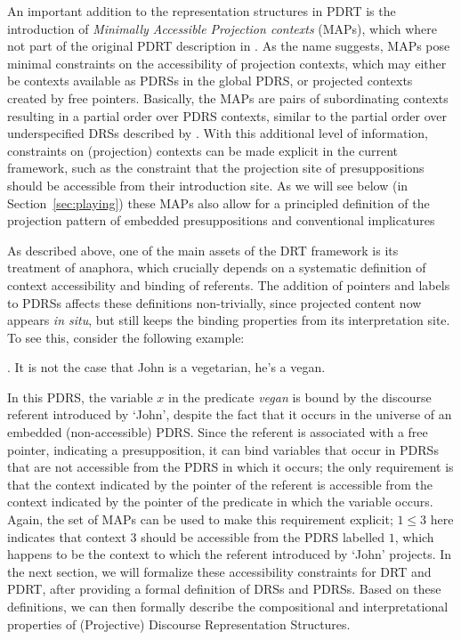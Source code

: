 An important addition to the representation structures in PDRT is the
introduction of \textit{Minimally Accessible Projection contexts} (MAPs),
which where not part of the original PDRT description in
. As the name suggests, MAPs pose minimal
constraints on the accessibility of projection contexts, which may either be
contexts available as PDRSs in the global PDRS, or projected contexts
created by free pointers.  Basically, the MAPs are pairs of subordinating
contexts resulting in a partial order over PDRS contexts, similar to the
partial order over underspecified DRSs described by
 \citeyear{reyle1993dealing,reyle1995reasoning}.
With this additional level of information, constraints on (projection)
contexts can be made explicit in the current framework, such as the
constraint that the projection site of presuppositions should be accessible
from their introduction site. As we will see below (in
Section~\ref{sec:playing}) these MAPs also allow for a principled definition
of the projection pattern of embedded presuppositions and conventional
implicatures 

As described above, one of the main assets of the DRT framework is its
treatment of anaphora, which crucially depends on a systematic definition of
context accessibility and binding of referents. The addition of pointers and
labels to PDRSs affects these definitions non-trivially, since projected
content now appears \textit{in situ}, but still keeps the binding properties
from its interpretation site. To see this, consider the following example:

\ex. It is not the case that John is a vegetarian, he's a vegan.\\

In this PDRS, the variable $x$ in the predicate \textit{vegan} is bound by
the discourse referent introduced by `John', despite the fact that it occurs
in the universe of an embedded (non-accessible) PDRS. Since the referent is
associated with a free pointer, indicating a presupposition, it can bind
variables that occur in PDRSs that are not accessible from the PDRS in which
it occurs; the only requirement is that the context indicated by the pointer
of the referent is accessible from the context indicated by the pointer of
the predicate in which the variable occurs. Again, the set of MAPs can be
used to make this requirement explicit; $1\leq 3$ here indicates that
context $3$ should be accessible from the PDRS labelled $1$, which happens
to be the context to which the referent introduced by `John' projects.  In
the next section, we will formalize these accessibility constraints for DRT
and PDRT, after providing a formal definition of DRSs and PDRSs. Based on
these definitions, we can then formally describe the compositional and
interpretational properties of (Projective) Discourse Representation
Structures.

